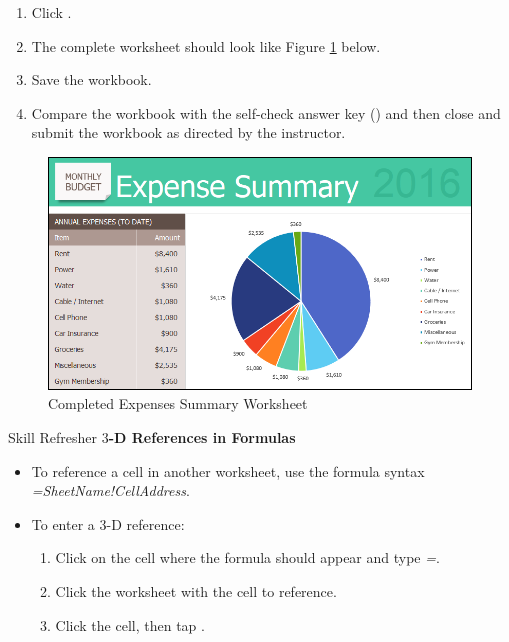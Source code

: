 \begin{enumbox}
\begin{enumerate}
		\item Click .
		\item The complete  worksheet should look like Figure \ref{06:fig08} below.
		\item Save the  workbook. 
		\item Compare the workbook with the self-check answer key () and then close and submit the  workbook as directed by the instructor.
	\end{enumerate}
\end{enumbox}
	
\begin{figure}[H]
	\centering
	\includegraphics[width=\maxwidth{.95\linewidth}]{gfx/ch06_fig08}
	\caption{Completed Expenses Summary Worksheet}
	\label{06:fig08}
\end{figure}

\begin{center}
	\begin{sklbox}{Skill Refresher}
		\textbf{$ 3 $-D References in Formulas}
		\\
		\begin{itemize}
			\setlength{\itemsep}{0pt}
			\setlength{\parskip}{0pt}
			\setlength{\parsep}{0pt}
			
			\item To reference a cell in another worksheet, use the formula syntax \textit{=SheetName!CellAddress}.
			\bigskip
			\item To enter a $ 3 $-D reference:

			\begin{enumerate}
				\item Click on the cell where the formula should appear and type \textit{=}.
				\item Click the worksheet with the cell to reference.
				\item Click the cell, then tap .
			\end{enumerate}
			
		\end{itemize}
	\end{sklbox}
\end{center}

